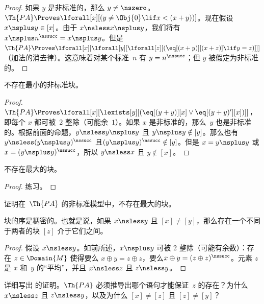 \documentclass[../../../include/open-logic-section]{subfiles}
\begin{document}
\begin{proof}
如果 $y$ 是非标准的，那么 $y \neq \nszero$。$\Th{PA} \Proves
\lforall[x][(y \neq \Obj{0} \lif x < (x+y))]$。现在假设 $x \nsplus y \in [x]$。由于 $x \nsless x \nsplus y$，我们将有 $x \nsplus n^\nssucc = x \nsplus y$。但是$\Th{PA} \Proves
\lforall[x][\lforall[y][\lforall[z][(\eq[(x+y)][(x+z)] \lif y = z)]]]$（加法的消去律）。这意味着对某个标准~$n$ 有 $y = n^\nssucc$；但 $y$ 被假定为非标准的。
\end{proof}

\begin{prop}
不存在最小的非标准块。
\end{prop}

\begin{proof}
$\Th{PA} \Proves \lforall[x][\lexists[y][(\eq[(y+y)][x] \lor
      \eq[(y+y)'][x])]]$，即每个 $x$ 都可被~$2$ 整除（可能余~$1$）。如果 $x$ 是非标准的，那么~$y$ 也是非标准的。根据前面的命题，$y \nsless y \nsplus y$ 且 $y \nsplus y \notin [y]$。那么也有 $y \nsless (y \nsplus y)^\nssucc$ 且$(y
  \nsplus y)^\nssucc \notin [y]$。但是 $x = y \nsplus y$ 或 $x = (y \nsplus y)^\nssucc$，所以 $y \nsless x$ 且 $y \notin [x]$。
\end{proof}

\begin{prop}
不存在最大的块。
\end{prop}

\begin{proof}
练习。
\end{proof}

\begin{prob}
证明在~$\Th{PA}$ 的非标准模型中，不存在最大的块。
\end{prob}

\begin{prop}
块的序是稠密的。也就是说，如果 $x \nsless y$ 且 $[x] \neq [y]$，那么存在一个不同于两者的块 $[z]$ 介于它们之间。
\end{prop}

\begin{proof}
假设 $x \nsless y$。如前所述，$x \nsplus y$ 可被 2 整除（可能有余数）：存在 $z \in \Domain{M}$ 使得要么 $x \oplus y = z \oplus z$，要么$x \oplus y = (z \oplus
z)^\nssucc$。元素 $z$ 是 $x$ 和~$y$ 的“平均”，并且 $x \nsless z$ 且 $z \nsless y$。
\end{proof}

\begin{prob}
详细写出  的证明。$\Th{PA}$ 必须推导出哪个语句才能保证~$z$ 的存在？为什么 $x \nsless z$ 且 $z \nsless y$，以及为什么 $[x] \neq [z]$ 且 $[z] \neq [y]$？
\end{prob}
\end{document}
